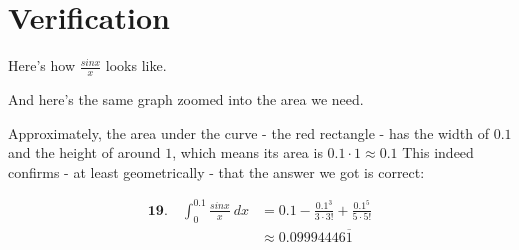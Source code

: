 \newpage

\section*{Verification}

Here's how $ \frac{sinx}{x} $
looks like.


And here's the same graph
zoomed into the area we need.


Approximately, the area under
the curve - the red rectangle -
has the width of
$ 0.1 $ and the height of 
around $ 1 $, which means its
area is $ 0.1 \cdot 1 \approx 0.1 $
This indeed confirms - at least
geometrically - that the answer we 
got is correct:

\begin{align}
	\textbf{19.}\quad \int_{0}^{0.1} 
	\frac{sinx}{x}\ dx
	&=
	0.1 
	-
	\frac{
		0.1^{3}
	}{
		3\cdot3!
	}
	+
	\frac{
		0.1^{5}
	}{
		5\cdot5!
	} \\
	&\approx
	0.09994446\overline{1}
\end{align}


